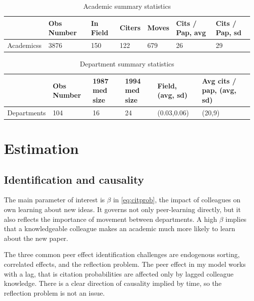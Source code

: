 \begin{table}[h!]
    \centering
    \begin{tabular}{|l|l|l|l|l|l|l|}
        \hline
                 & Obs Number & In Field & Citers & Moves & Cits / Pap, avg & Cits / Pap, sd \\ \hline
        Academicss  & 3876       & 150      & 122    & 679   & 26              & 29             \\ \hline
    \end{tabular}
    \caption{Academic summary statistics}
    \label{tab:aut_sum}
\end{table}

\begin{table}[h!]
    \centering
    \begin{tabular}{|l|l|l|l|l|l|l|}
        \hline
                    & Obs Number & 1987 med size & 1994 med size & Field, (avg, sd) & Avg cits / pap, (avg, sd) \\ \hline
        Departments & 104        & 16               & 24               & (0.03,0.06)           & (20,9) \\ \hline
    \end{tabular}
    \caption{Department summary statistics}
    \label{tab:dep_sum}
\end{table}

\section{Estimation}

\subsection{Identification and causality}
\label{sec:ident}

The main parameter of interest is $\beta$ in \eqref{eq:citprob}, the
impact of colleagues on own learning about new ideas. It
governs not only peer-learning directly, but it also reflects the importance 
of movement between departments.  A high $\beta$ implies that a knowledgeable
colleague makes an academic much more likely to learn about the new paper.

The three common peer effect identification challenges are endogenous sorting,
correlated effects, and the reflection problem.  The peer effect in my
model works with a lag, that is citation probabilities are affected only by 
lagged colleague knowledge.  There is a clear direction of 
causality implied by time, so the reflection problem is not an issue.

